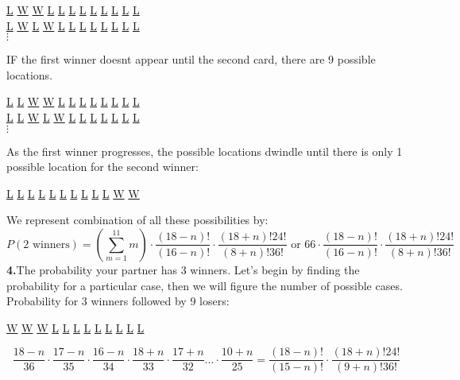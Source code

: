 \documentclass[11pt]{article}
\begin{document}
\begin {center}
  \underline{L} \underline{W} \underline{W} \underline{L} \underline{L} \underline{L} \underline{L} \underline{L} \underline{L} \underline{L} \underline{L} \underline{L}\\
\underline{L} \underline{W} \underline{L} \underline{W} \underline{L} \underline{L} \underline{L} \underline{L} \underline{L} \underline{L} \underline{L} \underline{L}\\
$\vdots$
  \end{center}
IF the first winner doesnt appear until the second card, there are 9 possible locations.
\begin {center}
  \underline{L} \underline{L} \underline{W} \underline{W} \underline{L} \underline{L} \underline{L} \underline{L} \underline{L} \underline{L} \underline{L} \underline{L}\\
\underline{L} \underline{L} \underline{W} \underline{L} \underline{W} \underline{L} \underline{L} \underline{L} \underline{L} \underline{L} \underline{L} \underline{L}\\
$\vdots$
  \end{center}
As the first winner progresses, the possible locations dwindle until there is only 1 possible location for the second winner:
\begin {center}
  \underline{L} \underline{L} \underline{L} \underline{L} \underline{L} \underline{L} \underline{L} \underline{L} \underline{L} \underline{L} \underline{W} \underline{W}\\
  \end{center}
We represent combination of all these possibilities by:
\begin{equation}
P(2\text{ winners})= \left( \displaystyle\sum_{m=1}^{11} m \right) \cdot \frac{(18-n)!}{(16-n)!}\cdot \frac{(18+n)!24!}{(8+n)!36!} \text{ or } 66 \cdot \frac{(18-n)!}{(16-n)!}\cdot \frac{(18+n)!24!}{(8+n)!36!}
\end{equation}
\indent \textbf{4.}The probability your partner has 3 winners. Let's begin by finding the probability for a particular case, then we will figure the number of possible cases. Probability for 3 winners followed by 9 losers:
\begin {center}
  \underline{W} \underline{W} \underline{W} \underline{L} \underline{L} \underline{L} \underline{L} \underline{L} \underline{L} \underline{L} \underline{L} \underline{L}\\
  \end{center}
\begin {equation} 
\frac{18-n}{36}\cdot \frac{17-n}{35}\cdot \frac{16-n}{34} \cdot \frac{18+n}{33}\cdot \frac{17+n}{32}...\cdot \frac {10+n}{25}=\frac{(18-n)!}{(15-n)!}\cdot \frac{(18+n)!24!}{(9+n)!36!}
\end{equation}
\end{document}

